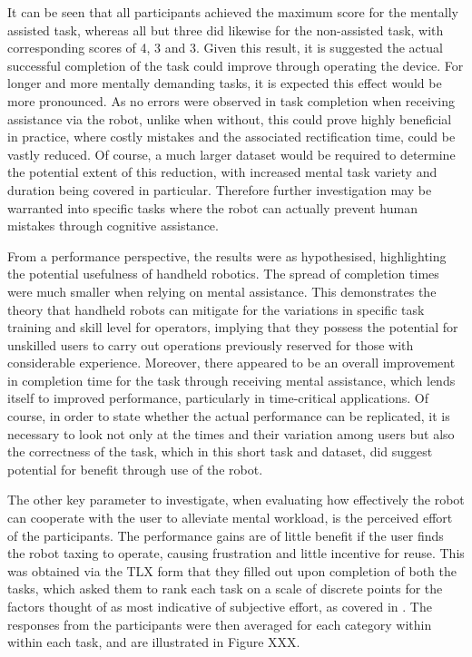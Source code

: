\documentclass[11pt]{article}
\begin{document}
It can be seen that all participants achieved the maximum score for the mentally assisted task, whereas all but three did likewise for the non-assisted task, with corresponding scores of 4, 3 and 3. Given this result, it is suggested the actual successful completion of the task could improve through operating the device. For longer and more mentally demanding tasks, it is expected this effect would be more pronounced. As no errors were observed in task completion when receiving assistance via the robot, unlike when without, this could prove highly beneficial in practice, where costly mistakes and the associated rectification time, could be vastly reduced. Of course, a much larger dataset would be required to determine the potential extent of this reduction, with increased mental task variety and duration being covered in particular. Therefore further investigation may be warranted into specific tasks where the robot can actually prevent human mistakes through cognitive assistance.


From a performance perspective, the results were as hypothesised, highlighting the potential usefulness of handheld robotics. The spread of completion times were much smaller when relying on mental assistance. This demonstrates the theory that handheld robots can mitigate for the variations in specific task training and skill level for operators, implying that they possess the potential for unskilled users to carry out operations previously reserved for those with considerable experience. Moreover, there appeared to be an overall improvement in completion time for the task through receiving mental assistance, which lends itself to improved performance, particularly in time-critical applications. Of course, in order to state whether the actual performance can be replicated, it is necessary to look not only at the times and their variation among users but also the correctness of the task, which in this short task and dataset, did suggest potential for benefit through use of the robot.


The other key parameter to investigate, when evaluating how effectively the robot can cooperate with the user to alleviate mental workload, is the perceived effort of the participants. The performance gains are of little benefit if the user finds the robot taxing to operate, causing frustration and little incentive for reuse. This was obtained via the TLX form that they filled out upon completion of both the tasks, which asked them to rank each task on a scale of discrete points for the factors thought of as most indicative of subjective effort, as covered in \cite{hart1988}. The responses from the participants were then averaged for each category within within each task, and are illustrated in Figure XXX.
\end{document}
